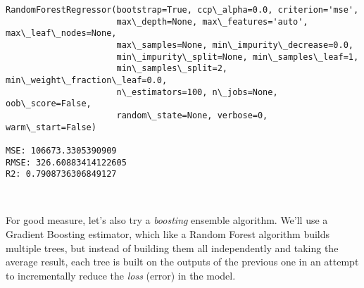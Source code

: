 \documentclass[11pt]{article}
\begin{document}
    \begin{Verbatim}[commandchars=\\\{\}]
RandomForestRegressor(bootstrap=True, ccp\_alpha=0.0, criterion='mse',
                      max\_depth=None, max\_features='auto', max\_leaf\_nodes=None,
                      max\_samples=None, min\_impurity\_decrease=0.0,
                      min\_impurity\_split=None, min\_samples\_leaf=1,
                      min\_samples\_split=2, min\_weight\_fraction\_leaf=0.0,
                      n\_estimators=100, n\_jobs=None, oob\_score=False,
                      random\_state=None, verbose=0, warm\_start=False)

MSE: 106673.3305390909
RMSE: 326.60883414122605
R2: 0.7908736306849127
    \end{Verbatim}

    \begin{center}
    \end{center}
    { \hspace*{\fill} \\}
    
    For good measure, let's also try a \emph{boosting} ensemble algorithm.
We'll use a Gradient Boosting estimator, which like a Random Forest
algorithm builds multiple trees, but instead of building them all
independently and taking the average result, each tree is built on the
outputs of the previous one in an attempt to incrementally reduce the
\emph{loss} (error) in the model.
\end{document}
